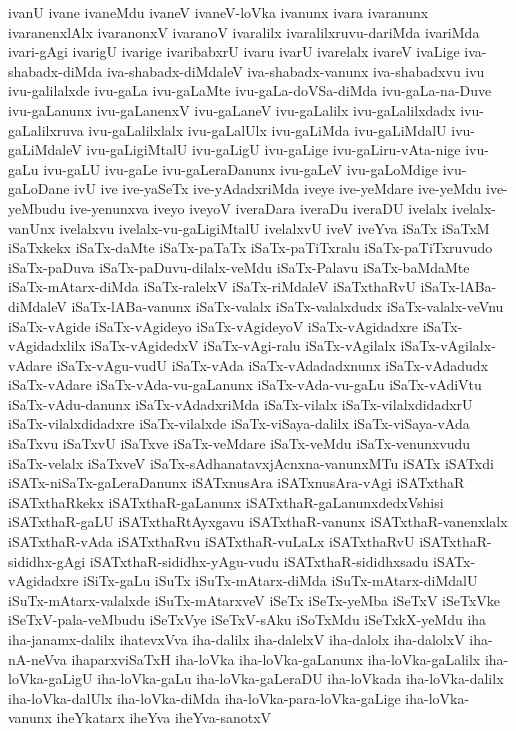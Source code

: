 {ivanU
ivane
ivaneMdu
ivaneV
ivaneV-loVka
ivanunx
ivara
ivaranunx
ivaranenxlAlx
ivaranonxV
ivaranoV
ivaralilx
ivaralilxruvu-dariMda
ivariMda
ivari-gAgi
ivarigU
ivarige
ivaribabxrU
ivaru
ivarU
ivarelalx
ivareV
ivaLige
iva-shabadx-diMda
iva-shabadx-diMdaleV
iva-shabadx-vanunx
iva-shabadxvu
ivu
ivu-galilalxde
ivu-gaLa
ivu-gaLaMte
ivu-gaLa-doVSa-diMda
ivu-gaLa-na-Duve
ivu-gaLanunx
ivu-gaLanenxV
ivu-gaLaneV
ivu-gaLalilx
ivu-gaLalilxdadx
ivu-gaLalilxruva
ivu-gaLalilxlalx
ivu-gaLalUlx
ivu-gaLiMda
ivu-gaLiMdalU
ivu-gaLiMdaleV
ivu-gaLigiMtalU
ivu-gaLigU
ivu-gaLige
ivu-gaLiru-vAta-nige
ivu-gaLu
ivu-gaLU
ivu-gaLe
ivu-gaLeraDanunx
ivu-gaLeV
ivu-gaLoMdige
ivu-gaLoDane
ivU
ive
ive-yaSeTx
ive-yAdadxriMda
iveye
ive-yeMdare
ive-yeMdu
ive-yeMbudu
ive-yenunxva
iveyo
iveyoV
iveraDara
iveraDu
iveraDU
ivelalx
ivelalx-vanUnx
ivelalxvu
ivelalx-vu-gaLigiMtalU
ivelalxvU
iveV
iveYva
iSaTx
iSaTxM
iSaTxkekx
iSaTx-daMte
iSaTx-paTaTx
iSaTx-paTiTxralu
iSaTx-paTiTxruvudo
iSaTx-paDuva
iSaTx-paDuvu-dilalx-veMdu
iSaTx-Palavu
iSaTx-baMdaMte
iSaTx-mAtarx-diMda
iSaTx-ralelxV
iSaTx-riMdaleV
iSaTxthaRvU
iSaTx-lABa-diMdaleV
iSaTx-lABa-vanunx
iSaTx-valalx
iSaTx-valalxdudx
iSaTx-valalx-veVnu
iSaTx-vAgide
iSaTx-vAgideyo
iSaTx-vAgideyoV
iSaTx-vAgidadxre
iSaTx-vAgidadxlilx
iSaTx-vAgidedxV
iSaTx-vAgi-ralu
iSaTx-vAgilalx
iSaTx-vAgilalx-vAdare
iSaTx-vAgu-vudU
iSaTx-vAda
iSaTx-vAdadadxnunx
iSaTx-vAdadudx
iSaTx-vAdare
iSaTx-vAda-vu-gaLanunx
iSaTx-vAda-vu-gaLu
iSaTx-vAdiVtu
iSaTx-vAdu-danunx
iSaTx-vAdadxriMda
iSaTx-vilalx
iSaTx-vilalxdidadxrU
iSaTx-vilalxdidadxre
iSaTx-vilalxde
iSaTx-viSaya-dalilx
iSaTx-viSaya-vAda
iSaTxvu
iSaTxvU
iSaTxve
iSaTx-veMdare
iSaTx-veMdu
iSaTx-venunxvudu
iSaTx-velalx
iSaTxveV
iSaTx-sAdhanatavxjAcnxna-vanunxMTu
iSATx
iSATxdi
iSATx-niSaTx-gaLeraDanunx
iSATxnusAra
iSATxnusAra-vAgi
iSATxthaR
iSATxthaRkekx
iSATxthaR-gaLanunx
iSATxthaR-gaLanunxdedxVshisi
iSATxthaR-gaLU
iSATxthaRtAyxgavu
iSATxthaR-vanunx
iSATxthaR-vanenxlalx
iSATxthaR-vAda
iSATxthaRvu
iSATxthaR-vuLaLx
iSATxthaRvU
iSATxthaR-sididhx-gAgi
iSATxthaR-sididhx-yAgu-vudu
iSATxthaR-sididhxsadu
iSATx-vAgidadxre
iSiTx-gaLu
iSuTx
iSuTx-mAtarx-diMda
iSuTx-mAtarx-diMdalU
iSuTx-mAtarx-valalxde
iSuTx-mAtarxveV
iSeTx
iSeTx-yeMba
iSeTxV
iSeTxVke
iSeTxV-pala-veMbudu
iSeTxVye
iSeTxV-sAku
iSoTxMdu
iSeTxkX-yeMdu
iha
iha-janamx-dalilx
ihatevxVva
iha-dalilx
iha-dalelxV
iha-dalolx
iha-dalolxV
iha-nA-neVva
ihaparxviSaTxH
iha-loVka
iha-loVka-gaLanunx
iha-loVka-gaLalilx
iha-loVka-gaLigU
iha-loVka-gaLu
iha-loVka-gaLeraDU
iha-loVkada
iha-loVka-dalilx
iha-loVka-dalUlx
iha-loVka-diMda
iha-loVka-para-loVka-gaLige
iha-loVka-vanunx
iheYkatarx
iheYva
iheYva-sanotxV
}
